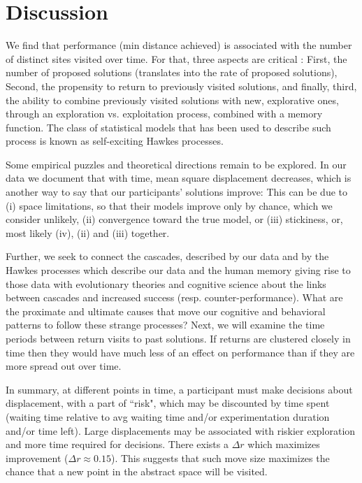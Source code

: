 \section{Discussion}
We find that performance (min distance achieved) is associated with the number of distinct sites visited over time. For that, three aspects are critical : First, the number of proposed solutions (translates into the rate of proposed solutions),  Second, the propensity to return to previously visited solutions, and finally, third, the ability to combine previously visited solutions with new, explorative ones, through an exploration vs. exploitation process, combined with a memory function.  The class of statistical models that has been used to describe such process is known as self-exciting Hawkes processes. 

Some empirical puzzles and theoretical directions remain to be explored. 
In our data we document that with time, mean square displacement decreases, which is another way to say that our participants' solutions improve: This can be due to (i) space limitations, so that their models improve only by chance, which we consider unlikely, (ii) convergence toward the true model, or (iii) stickiness, or, most likely (iv), (ii) and (iii) together.
  
Further, we seek to connect the cascades, described by our data and by the Hawkes processes which describe our data and the human memory giving rise to those data with evolutionary theories and cognitive science about the links between cascades and increased success (resp. counter-performance).  What are the proximate and ultimate causes that move our cognitive and behavioral patterns to follow these strange processes? Next, we will examine the time periods between return visits to past solutions.  If returns are clustered closely in time then they would have much less of an effect on performance than if they are more spread out over time.  



In summary, at different points in time, a participant must make decisions about displacement, with a part of ``risk", which may be discounted by time spent (waiting time relative to avg waiting time and/or experimentation duration and/or time left). Large displacements may be associated with riskier exploration and more time required for decisions. There exists a $\Delta r$ which maximizes improvement ($\Delta r \approx 0.15$). This suggests that such move size maximizes the chance that a new point in the abstract space will be visited.














